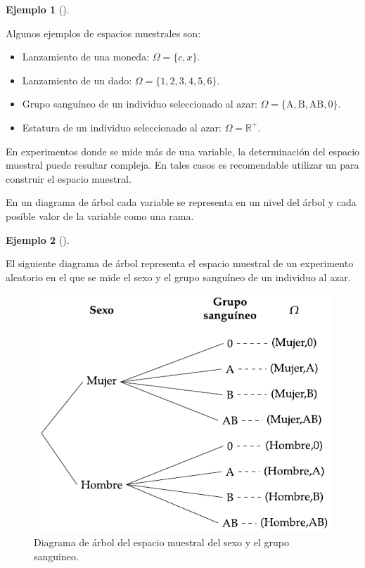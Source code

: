 \documentclass[
  a4paper,
]{scrreport}
\providecommand{\tightlist}{%
  \setlength{\itemsep}{0pt}\setlength{\parskip}{0pt}}\usepackage{longtable,booktabs,array}
\theoremstyle{plain}
\theoremstyle{definition}
\newtheorem{example}{Ejemplo}[chapter]
\theoremstyle{definition}
\theoremstyle{remark}
\begin{document}
\begin{example}[]\protect\hypertarget{exm-espacios-muestrales}{}\label{exm-espacios-muestrales}

Algunos ejemplos de espacios muestrales son:

\begin{itemize}
\tightlist
\item
  Lanzamiento de una moneda: \(\Omega=\{c,x\}\).
\item
  Lanzamiento de un dado: \(\Omega=\{1,2,3,4,5,6\}\).
\item
  Grupo sanguíneo de un individuo seleccionado al azar:
  \(\Omega=\{\mbox{A},\mbox{B},\mbox{AB},\mbox{0}\}\).
\item
  Estatura de un individuo seleccionado al azar:
  \(\Omega=\mathbb{R}^+\).
\end{itemize}

\end{example}

En experimentos donde se mide más de una variable, la determinación del
espacio muestral puede resultar compleja. En tales casos es recomendable
utilizar un para construir el espacio muestral.

En un diagrama de árbol cada variable se representa en un nivel del
árbol y cada posible valor de la variable como una rama.

\begin{example}[]\protect\hypertarget{exm-diagrama-arbol}{}\label{exm-diagrama-arbol}

El siguiente diagrama de árbol representa el espacio muestral de un
experimento aleatorio en el que se mide el sexo y el grupo sanguíneo de
un individuo al azar.

\begin{figure}[H]

{\centering \includegraphics{img/probabilidad/espacio_muestral.pdf}

}

\caption{Diagrama de árbol del espacio muestral del sexo y el grupo
sanguineo.}

\end{figure}%

\end{example}
\end{document}
